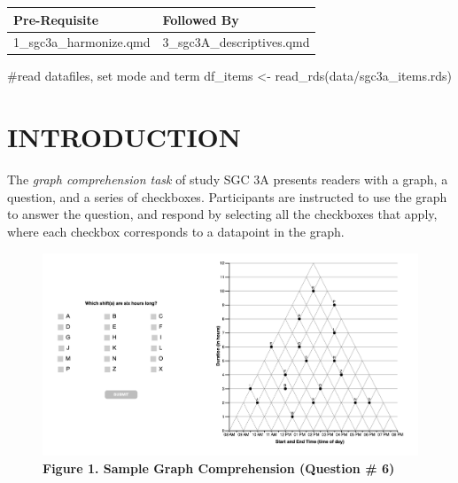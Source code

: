 \documentclass[
  letterpaper,
  DIV=11,
  numbers=noendperiod]{scrreprt}
\newenvironment{Shaded}{\begin{snugshade}}{\end{snugshade}}
\newcommand{\CommentTok}[1]{\textcolor[rgb]{0.37,0.37,0.37}{#1}}
\newcommand{\FunctionTok}[1]{\textcolor[rgb]{0.28,0.35,0.67}{#1}}
\newcommand{\NormalTok}[1]{\textcolor[rgb]{0.00,0.23,0.31}{#1}}
\newcommand{\OtherTok}[1]{\textcolor[rgb]{0.00,0.23,0.31}{#1}}
\newcommand{\StringTok}[1]{\textcolor[rgb]{0.13,0.47,0.30}{#1}}
\begin{document}
\begin{longtable}[]{@{}ll@{}}
\toprule()
Pre-Requisite & Followed By \\
\midrule()
\endhead
1\_sgc3a\_harmonize.qmd & 3\_sgc3A\_descriptives.qmd \\
\bottomrule()
\end{longtable}

\begin{Shaded}
\begin{Highlighting}[]
\CommentTok{\#read datafiles, set mode and term}
\NormalTok{df\_items }\OtherTok{\textless{}{-}} \FunctionTok{read\_rds}\NormalTok{(}\StringTok{\textquotesingle{}data/sgc3a\_items.rds\textquotesingle{}}\NormalTok{)}
\end{Highlighting}
\end{Shaded}

\hypertarget{introduction-1}{%
\chapter{INTRODUCTION}\label{introduction-1}}

The \emph{graph comprehension task} of study SGC 3A presents readers
with a graph, a question, and a series of checkboxes. Participants are
instructed to use the graph to answer the question, and respond by
selecting all the checkboxes that apply, where each checkbox corresponds
to a datapoint in the graph.

\begin{figure}

{\centering \includegraphics{analysis/SGC3A/static/img/sample_graphComprehensionTask.png}

}

\caption{\textbf{Figure 1. Sample Graph Comprehension (Question \# 6)}}

\end{figure}
\end{document}
